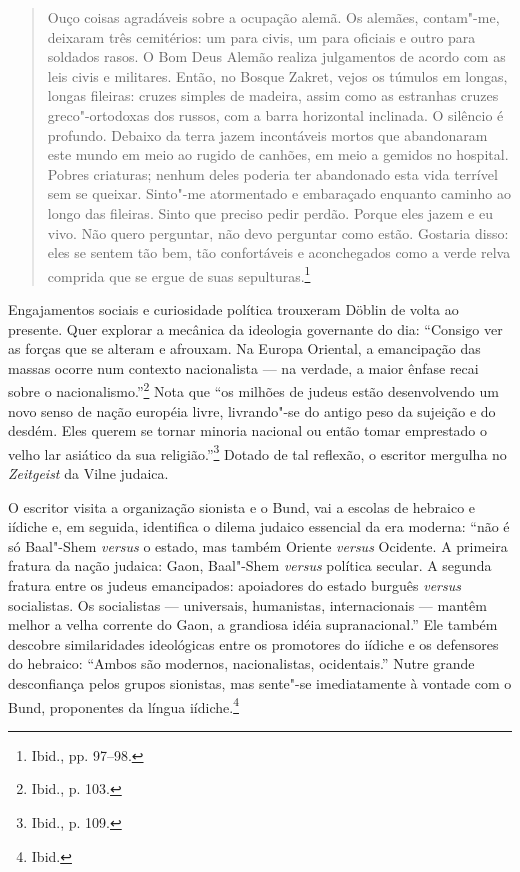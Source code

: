 \begin{quote}
Ouço coisas agradáveis sobre a ocupação alemã. Os alemães, contam"-me,
deixaram três cemitérios: um para civis, um para oficiais e outro para
soldados rasos. O Bom Deus Alemão realiza julgamentos de acordo com as
leis civis e militares. Então, no Bosque Zakret, vejos os túmulos em
longas, longas fileiras: cruzes simples de madeira, assim como as
estranhas cruzes greco"-ortodoxas dos russos, com a barra horizontal
inclinada. O silêncio é profundo. Debaixo da terra jazem incontáveis
mortos que abandonaram este mundo em meio ao rugido de canhões, em meio
a gemidos no hospital. Pobres criaturas; nenhum deles poderia ter
abandonado esta vida terrível sem se queixar. Sinto"-me atormentado e
embaraçado enquanto caminho ao longo das fileiras. Sinto que preciso
pedir perdão. Porque eles jazem e eu vivo. Não quero perguntar, não devo
perguntar como estão. Gostaria disso: eles se sentem tão bem, tão
confortáveis e aconchegados como a verde relva comprida que se ergue de
suas sepulturas.\footnote{Ibid., pp. 97--98.}
\end{quote}

Engajamentos sociais e curiosidade política trouxeram Döblin de volta ao
presente. Quer explorar a mecânica da ideologia governante do dia:
``Consigo ver as forças que se alteram e afrouxam. Na Europa Oriental, a
emancipação das massas ocorre num contexto nacionalista --- na verdade, a
maior ênfase recai sobre o nacionalismo.''\footnote{Ibid., p. 103.} Nota
que ``os milhões de judeus estão desenvolvendo um novo senso de nação
européia livre, livrando"-se do antigo peso da sujeição e do desdém. Eles
querem se tornar minoria nacional ou então tomar emprestado o velho lar
asiático da sua religião.''\footnote{Ibid., p. 109.} Dotado de tal
reflexão, o escritor mergulha no \emph{Zeitgeist} da Vilne judaica.

O escritor visita a organização sionista e o Bund, vai a escolas de
hebraico e iídiche e, em seguida, identifica o dilema judaico essencial
da era moderna: ``não é só Baal"-Shem \emph{versus} o estado, mas também
Oriente \emph{versus} Ocidente. A primeira fratura da nação judaica:
Gaon, Baal"-Shem \emph{versus} política secular. A segunda fratura entre
os judeus emancipados: apoiadores do estado burguês \emph{versus}
socialistas. Os socialistas --- universais, humanistas, internacionais ---
mantêm melhor a velha corrente do Gaon, a grandiosa idéia
supranacional.'' Ele também descobre similaridades ideológicas entre os
promotores do iídiche e os defensores do hebraico: ``Ambos são modernos,
nacionalistas, ocidentais.'' Nutre grande desconfiança pelos grupos
sionistas, mas sente"-se imediatamente à vontade com o Bund, proponentes
da língua iídiche.\footnote{Ibid.}

